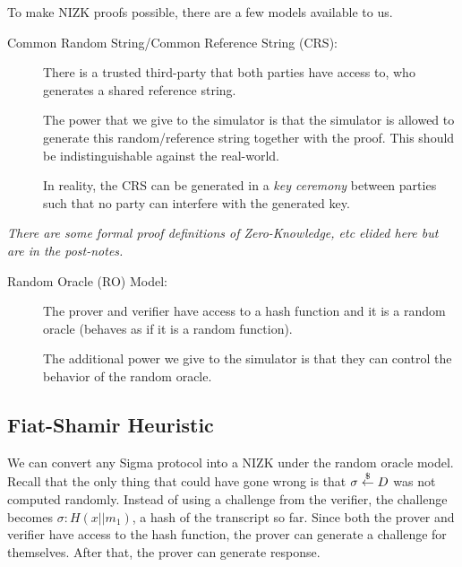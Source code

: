 To make NIZK proofs possible, there are a few models available to us.

\begin{mdframed}[style=mdgreenbox]
    \begin{description}
        \item[Common Random String/Common Reference String (CRS):] There is a trusted third-party that both parties have access to, who generates a shared reference string.

            The power that we give to the simulator is that the simulator is allowed to generate this random/reference string together with the proof. This should be indistinguishable against the real-world.

            In reality, the CRS can be generated in a \emph{key ceremony} between parties such that no party can interfere with the generated key.

    \end{description}
    \emph{There are some formal proof definitions of Zero-Knowledge, etc elided here but are in the post-notes. }
\end{mdframed}

\begin{mdframed}[style=mdgreenbox]
    \begin{description}
        \item[Random Oracle (RO) Model:] The prover and verifier have access to a hash function and it is a random oracle (behaves as if it is a random function).

            The additional power we give to the simulator is that they can control the behavior of the random oracle.
    \end{description}
\end{mdframed}

\subsection{Fiat-Shamir Heuristic}\label{sec:mar7-fiat-shamir}

We can convert any Sigma protocol into a NIZK under the random oracle model. Recall that the only thing that could have gone wrong is that $\sigma\overset{\$}{\leftarrow} D$ was not computed randomly. Instead of using a challenge from the verifier, the challenge becomes $\sigma: H(x||m_1)$, a hash of the transcript so far. Since both the prover and verifier have access to the hash function, the prover can generate a challenge for themselves. After that, the prover can generate response.

